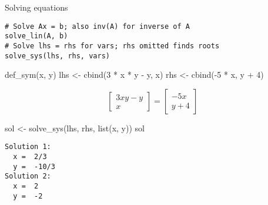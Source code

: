 \documentclass[
  ignorenonframetext,
]{beamer}
\newenvironment{Shaded}{\begin{snugshade}}{\end{snugshade}}
\newcommand{\DecValTok}[1]{\textcolor[rgb]{0.68,0.00,0.00}{#1}}
\newcommand{\FunctionTok}[1]{\textcolor[rgb]{0.28,0.35,0.67}{#1}}
\newcommand{\NormalTok}[1]{\textcolor[rgb]{0.00,0.23,0.31}{#1}}
\newcommand{\OtherTok}[1]{\textcolor[rgb]{0.00,0.23,0.31}{#1}}
\newcommand{\SpecialCharTok}[1]{\textcolor[rgb]{0.37,0.37,0.37}{#1}}
\begin{document}
\begin{frame}[fragile]{Solving equations}
\protect\hypertarget{solving-equations}{}
\begin{verbatim}
# Solve Ax = b; also inv(A) for inverse of A
solve_lin(A, b)
# Solve lhs = rhs for vars; rhs omitted finds roots
solve_sys(lhs, rhs, vars) 
\end{verbatim}

\begin{Shaded}
\begin{Highlighting}[]
\FunctionTok{def\_sym}\NormalTok{(x, y)}
\NormalTok{lhs }\OtherTok{\textless{}{-}} \FunctionTok{cbind}\NormalTok{(}\DecValTok{3} \SpecialCharTok{*}\NormalTok{ x }\SpecialCharTok{*}\NormalTok{ y }\SpecialCharTok{{-}}\NormalTok{ y, x)}
\NormalTok{rhs }\OtherTok{\textless{}{-}} \FunctionTok{cbind}\NormalTok{(}\SpecialCharTok{{-}}\DecValTok{5} \SpecialCharTok{*}\NormalTok{ x, y }\SpecialCharTok{+} \DecValTok{4}\NormalTok{)}
\end{Highlighting}
\end{Shaded}

\[
\left[\begin{matrix}3 x y - y\\x\end{matrix}\right] = \left[\begin{matrix}- 5 x\\y + 4\end{matrix}\right] 
\]
\end{frame}

\begin{frame}[fragile]
\begin{Shaded}
\begin{Highlighting}[]
\NormalTok{sol }\OtherTok{\textless{}{-}} \FunctionTok{solve\_sys}\NormalTok{(lhs, rhs, }\FunctionTok{list}\NormalTok{(x, y))}
\NormalTok{sol}
\end{Highlighting}
\end{Shaded}

\begin{verbatim}
Solution 1:
  x =  2/3 
  y =  -10/3 
Solution 2:
  x =  2 
  y =  -2 
\end{verbatim}
\end{frame}
\end{document}
